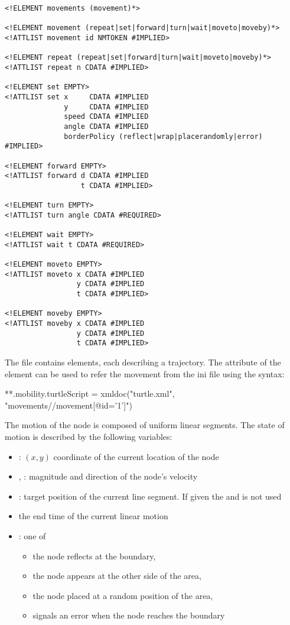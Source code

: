 \begin{verbatim}
<!ELEMENT movements (movement)*>

<!ELEMENT movement (repeat|set|forward|turn|wait|moveto|moveby)*>
<!ATTLIST movement id NMTOKEN #IMPLIED>

<!ELEMENT repeat (repeat|set|forward|turn|wait|moveto|moveby)*>
<!ATTLIST repeat n CDATA #IMPLIED>

<!ELEMENT set EMPTY>
<!ATTLIST set x     CDATA #IMPLIED
              y     CDATA #IMPLIED
              speed CDATA #IMPLIED
              angle CDATA #IMPLIED
              borderPolicy (reflect|wrap|placerandomly|error) #IMPLIED>

<!ELEMENT forward EMPTY>
<!ATTLIST forward d CDATA #IMPLIED
                  t CDATA #IMPLIED>

<!ELEMENT turn EMPTY>
<!ATTLIST turn angle CDATA #REQUIRED>

<!ELEMENT wait EMPTY>
<!ATTLIST wait t CDATA #REQUIRED>

<!ELEMENT moveto EMPTY>
<!ATTLIST moveto x CDATA #IMPLIED
                 y CDATA #IMPLIED
                 t CDATA #IMPLIED>

<!ELEMENT moveby EMPTY>
<!ATTLIST moveby x CDATA #IMPLIED
                 y CDATA #IMPLIED
                 t CDATA #IMPLIED>
\end{verbatim}

The file contains  elements, each describing a trajectory.
The  attribute of the  element can be used to
refer the movement from the ini file using the syntax:

\begin{inifile}
**.mobility.turtleScript = xmldoc("turtle.xml", "movements//movement[@id='1']")
\end{inifile}

The motion of the node is composed of uniform linear segments.
The state of motion is described by the following variables:
\begin{itemize} 
\item {}: $(x,y)$ coordinate of the current location of the node
\item {}, : magnitude and direction of the node's velocity
\item {}: target position of the current line segment. If given
                       the  and  is not used
\item {} the end time of the current linear motion
\item {}: one of
    \begin{itemize}
      \item {} the node reflects at the boundary,
      \item {} the node appears at the other side of the area,
      \item {} the node placed at a random position of the area,
      \item {} signals an error when the node reaches the boundary
    \end{itemize}
\end{itemize}

